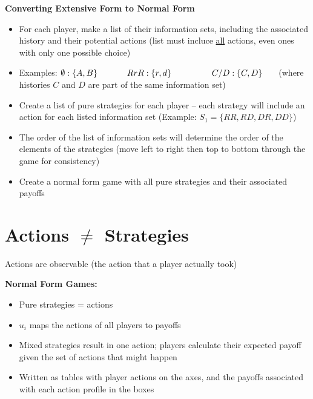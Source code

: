 \documentclass{report}
\newcommand{\FlowerSmall}{\mbox{\raisebox{-1pt}{\small\EightFlowerPetalRemoved}}} %
\begin{document}
\bigskip
\begin{mdframed}
	\medskip
	\begin{center} \textbf{{\large Converting Extensive Form to Normal Form}} \end{center}
	\begin{itemize}[label=\FlowerSmall]
		\item{For each player, make a list of their information sets, including the associated history and their potential actions (list must incluce \underline{all} actions, even ones with only one possible choice)}
		\item{Examples: $\emptyset: \{A,B\} \hspace{35pt} RrR:\{r,d\} \\ \hspace*{48pt} C/D:\{C,D\} \hspace{15pt}$ (where histories $C$ and $D$ are part of the same information set)}
	\item{Create a list of pure strategies for each player -- each strategy will include an action for each listed information set \hspace{15pt} (Example: $S_1 = \{ RR,RD,DR,DD\}$)}
	\item{The order of the list of information sets will determine the order of the elements of the strategies (move left to right then top to bottom through the game for consistency)}
	\item{Create a normal form game with all pure strategies and their associated payoffs}
	\end{itemize}
	\smallskip
\end{mdframed}

\newpage
\section*{Actions $\neq$ Strategies}

Actions are observable (the action that a player actually took) \bigskip

\textbf{Normal Form Games:}
\begin{itemize}
	\item Pure strategies = actions
	\item $u_i$ maps the actions of all players to payoffs
	\item Mixed strategies result in one action; players calculate their expected payoff given the set of actions that might happen
	\item Written as tables with player actions on the axes, and the payoffs associated with each action profile in the boxes
\end{itemize} \bigskip 
\end{document}
